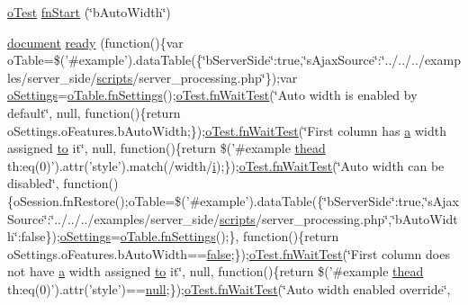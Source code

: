 \begin{DoxyCompactItemize}
\item 
\hyperlink{unit__test_8js_a3b2d259e2df3b6860d9047a92d09d0d6}{o\+Test} \hyperlink{4__server-side_2b_auto_width_8js_a9904115d645454fb740fef072c397969}{fn\+Start} (\char`\"{}b\+Auto\+Width\char`\"{})
\item 
\hyperlink{outside_events_8js_aa14f8e0338cced6720590fd2ea13bd4b}{document} \hyperlink{4__server-side_2b_auto_width_8js_aaae1853a4698fc1c4a81c78ffdeee7d9}{ready} (function()\{var o\+Table=\$('\#example').data\+Table(\{\char`\"{}b\+Server\+Side\char`\"{}\+:true,\char`\"{}s\+Ajax\+Source\char`\"{}\+:\char`\"{}../../../examples/server\+\_\+side/\hyperlink{tinymce_8jquery_8dev_8js_a09066d4d580eeec222f858d588b4cdef}{scripts}/server\+\_\+processing.\+php\char`\"{}\});var \hyperlink{model_8settings_8js_a4857b9c813b4dea010668e9555d0aca7}{o\+Settings}=\hyperlink{api_8methods_8js_a78f387fab92a85c2cb7830bc5d8a6141}{o\+Table.\+fn\+Settings}();\hyperlink{onhold_24__server-side_2__zero__config_8js_ab25c4d596771c0133cdc45178ce72c3d}{o\+Test.\+fn\+Wait\+Test}(\char`\"{}Auto width is enabled by default\char`\"{}, null, function()\{return o\+Settings.\+o\+Features.\+b\+Auto\+Width;\});\hyperlink{onhold_24__server-side_2__zero__config_8js_ab25c4d596771c0133cdc45178ce72c3d}{o\+Test.\+fn\+Wait\+Test}(\char`\"{}First column has \hyperlink{media_2js_2jquery_8js_aa4d4888597588a84fd5b1184d00c91f3}{a} width assigned \hyperlink{jquery-ui_8js_af6086621f45baa2cf538f19e45d3c263}{to} it\char`\"{}, null, function()\{return \$('\#example \hyperlink{core_8constructor_8js_a856be760b6816c9591ce69f0a2b43693}{thead} th\+:eq(0)').attr('style').match(/width/\hyperlink{validate_8js_a5e25b1d1bed9ab5f3174b76d6a722180}{i});\});\hyperlink{onhold_24__server-side_2__zero__config_8js_ab25c4d596771c0133cdc45178ce72c3d}{o\+Test.\+fn\+Wait\+Test}(\char`\"{}Auto width can be disabled\char`\"{}, function()\{o\+Session.\+fn\+Restore();o\+Table=\$('\#example').data\+Table(\{\char`\"{}b\+Server\+Side\char`\"{}\+:true,\char`\"{}s\+Ajax\+Source\char`\"{}\+:\char`\"{}../../../examples/server\+\_\+side/\hyperlink{tinymce_8jquery_8dev_8js_a09066d4d580eeec222f858d588b4cdef}{scripts}/server\+\_\+processing.\+php\char`\"{},\char`\"{}b\+Auto\+Width\char`\"{}\+:false\});\hyperlink{model_8settings_8js_a4857b9c813b4dea010668e9555d0aca7}{o\+Settings}=\hyperlink{api_8methods_8js_a78f387fab92a85c2cb7830bc5d8a6141}{o\+Table.\+fn\+Settings}();\}, function()\{return o\+Settings.\+o\+Features.\+b\+Auto\+Width==\hyperlink{validate_8js_a5df37b7f02e5cdc7d9412b7f872b8e01}{false};\});\hyperlink{onhold_24__server-side_2__zero__config_8js_ab25c4d596771c0133cdc45178ce72c3d}{o\+Test.\+fn\+Wait\+Test}(\char`\"{}First column does not have \hyperlink{media_2js_2jquery_8js_aa4d4888597588a84fd5b1184d00c91f3}{a} width assigned \hyperlink{jquery-ui_8js_af6086621f45baa2cf538f19e45d3c263}{to} it\char`\"{}, null, function()\{return \$('\#example \hyperlink{core_8constructor_8js_a856be760b6816c9591ce69f0a2b43693}{thead} th\+:eq(0)').attr('style')==\hyperlink{validate_8js_afb8e110345c45e74478894341ab6b28e}{null};\});\hyperlink{onhold_24__server-side_2__zero__config_8js_ab25c4d596771c0133cdc45178ce72c3d}{o\+Test.\+fn\+Wait\+Test}(\char`\"{}Auto width enabled override\char`\"{}, 
\end{DoxyCompactItemize}
